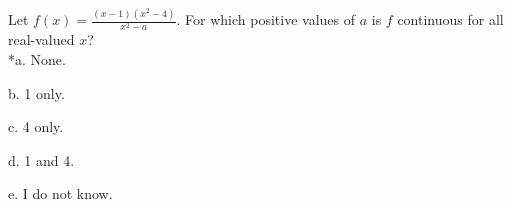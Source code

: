 
Let \(f(x)=\frac{(x-1)(x^2-4)}{x^2-a}\). For which positive values of \(a\)
is \(f\) continuous for all real-valued \(x\)?\\

*a. None.

b. 1 only.

c. 4 only.

d. 1 and 4.

e. I do not know.\\
